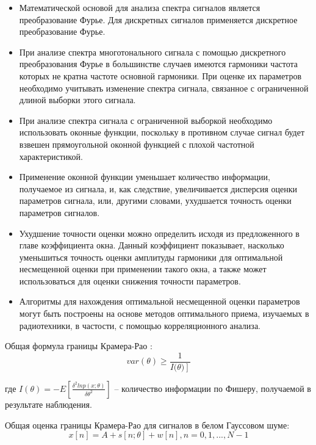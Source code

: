 \begin{itemize}
\item Математической основой для анализа спектра сигналов является преобразование Фурье. Для дискретных сигналов применяется дискретное преобразование Фурье.

\item При анализе спектра многотонального сигнала с помощью дискретного преобразования Фурье в большинстве случаев имеются гармоники частота которых не кратна частоте основной гармоники. При оценке их параметров необходимо учитывать изменение спектра сигнала, связанное с ограниченной длиной выборки этого сигнала.

\item При анализе спектра сигнала с ограниченной выборкой необходимо использовать оконные функции, поскольку в противном случае сигнал будет взвешен прямоугольной оконной функцией с плохой частотной характеристикой.

\item Применение оконной функции уменьшает количество информации, получаемое из сигнала, и, как следствие, увеличивается дисперсия оценки параметров сигнала, или, другими словами, ухудшается точность оценки параметров сигналов.

\item Ухудшение точности оценки можно определить исходя из предложенного в главе коэффициента окна. Данный коэффициент показывает, насколько уменьшиться точность оценки амплитуды гармоники для оптимальной несмещенной оценки при применении такого окна, а также может использоваться для оценки снижения точности параметров.

\item Алгоритмы для нахождения оптимальной несмещенной оценки параметров могут быть построены на основе методов оптимального приема, изучаемых в радиотехники, в частости, с помощью корреляционного анализа.
\end{itemize}

Общая формула границы Крамера-Рао \cite{kay1993fundamentals, kay2013fundamentals}:
\begin{equation}
	\label{eq:equation2}
	var(\theta)\geq\frac{1}{I(\left.\theta)\right]}
\end{equation}

где $I(\theta)=-E\left[\frac{\delta^2 ln p(x;\theta)}{\delta\theta^2}\right]$ -- количество информации по Фишеру, получаемой в результате наблюдения.

Общая оценка границы Крамера-Рао для сигналов в белом Гауссовом шуме:
\begin{equation}
	\label{eq:equation14}
	x[n] = A + s[n;\theta] + w[n], n=0,1,...,N-1	
\end{equation}

